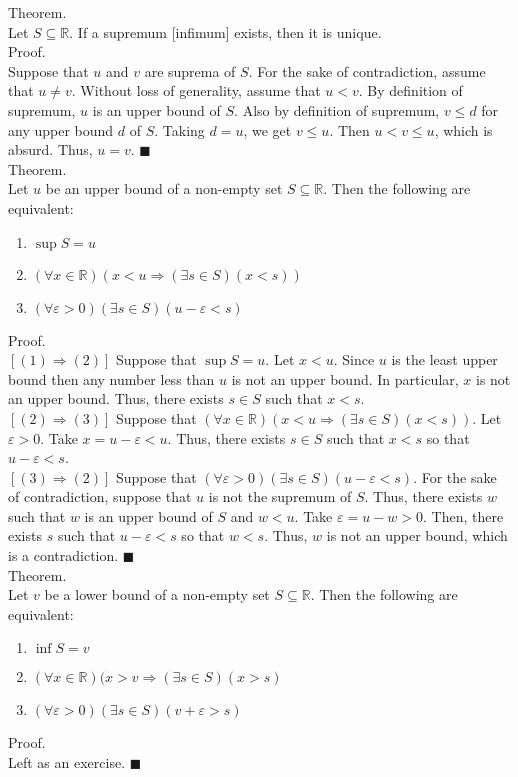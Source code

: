 \documentclass[twocolumn]{article}
\newcommand{\qed}{$\blacksquare$}
\newcommand{\reals}{\mathbb{R}}
\begin{document}
Theorem. \\
Let $S \subseteq \reals$. If a supremum [infimum] exists, then it is unique. \\
Proof. \\
Suppose that $u$ and $v$ are suprema of $S$. For the sake of contradiction, assume that $u \neq v$. Without loss of generality, assume that $u < v$. By definition of supremum, $u$ is an upper bound of $S$. Also by definition of supremum, $v \leq d$ for any upper bound $d$ of $S$. Taking $d = u$, we get $v \leq u$. Then $u < v \leq u$, which is absurd. Thus, $u = v$. \qed \\

Theorem. \\
Let $u$ be an upper bound of a non-empty set $S \subseteq \reals$. Then the following are equivalent:
\begin{enumerate}
	\item
		$\sup S = u$
	\item
		$(\forall x \in \reals)(x < u \Rightarrow (\exists s \in S)(x < s))$
	\item
		$(\forall \varepsilon > 0)(\exists s \in S)(u - \varepsilon < s)$
\end{enumerate}
Proof. \\
$\left[(1) \Rightarrow (2)\right]$ Suppose that $\sup S = u$. Let $x < u$. Since $u$ is the least upper bound then any number less than $u$ is not an upper bound. In particular, $x$ is not an upper bound. Thus, there exists $s \in S$ such that $x < s$. \\
$\left[(2) \Rightarrow (3)\right]$ Suppose that $(\forall x \in \reals)(x < u \Rightarrow (\exists s \in S)(x < s))$. Let $\varepsilon > 0$. Take $x = u - \varepsilon < u$. Thus, there exists $s \in S$ such that $x < s$ so that $u - \varepsilon < s$. \\
$\left[(3) \Rightarrow (2)\right]$ Suppose that $(\forall \varepsilon > 0)(\exists s \in S)(u - \varepsilon < s)$. For the sake of contradiction, suppose that $u$ is not the supremum of $S$. Thus, there exists $w$ such that $w$ is an upper bound of $S$ and $w < u$. Take $\varepsilon = u - w > 0$. Then, there exists $s$ such that $u - \varepsilon < s$ so that $w < s$. Thus, $w$ is not an upper bound, which is a contradiction. \qed \\

Theorem. \\
Let $v$ be a lower bound of a non-empty set $S \subseteq \reals$. Then the following are equivalent:
\begin{enumerate}
	\item
		$\inf S = v$
	\item
		$(\forall x \in \reals)(x > v \Rightarrow (\exists s \in S)(x > s)$
	\item
		$(\forall \varepsilon > 0)(\exists s \in S)(v + \varepsilon > s)$
\end{enumerate}
Proof. \\
Left as an exercise. \qed \\
\end{document}
